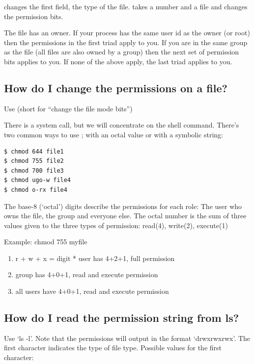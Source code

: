  changes the first field, the type of the file.  takes a number and a file and changes the permission bits.

The file has an owner. If your process has the same user id as the owner (or root) then the permissions in the first triad apply to you. If you are in the same group as the file (all files are also owned by a group) then the next set of permission bits applies to you. If none of the above apply, the last triad applies to you.

\subsection{How do I change the permissions on a file?}\label{how-do-i-change-the-permissions-on-a-file}

Use  (short for ``change the file mode bits'')

There is a system call,  but we will concentrate on the shell command. There's two common ways to use  ; with an octal value or with a symbolic string:

\begin{lstlisting}
$ chmod 644 file1
$ chmod 755 file2
$ chmod 700 file3
$ chmod ugo-w file4
$ chmod o-rx file4
\end{lstlisting}

The base-8 (`octal') digits describe the permissions for each role: The user who owns the file, the group and everyone else. The octal number is the sum of three values given to the three types of permission: read(4), write(2), execute(1)

Example: chmod 755 myfile 

\begin{enumerate}
\item r + w + x = digit * user has 4+2+1, full permission 
\item group has 4+0+1, read and execute permission 
\item all users have 4+0+1, read and execute permission
\end{enumerate}

\subsection{How do I read the permission string from ls?}\label{how-do-i-read-the-permission-string-from-ls}

Use `ls -l'. Note that the permissions will output in the format `drwxrwxrwx'. The first character indicates the type of file type. Possible values for the first character: 

